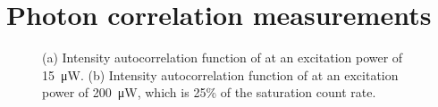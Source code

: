 



\section[g2 Measurements]{Photon correlation measurements} \label{sec::g2}



	\begin{figure}[tp]
		\begin{subfigure}[tp]{ 0.49\linewidth}
			\caption{}\label{subfig::g2_a}
			\centering
		\end{subfigure}
		\hfill
		\begin{subfigure}[tp]{ 0.49\linewidth}
			\caption{}\label{subfig::g2_b}
			\centering
		\end{subfigure}
		\caption{(a) Intensity autocorrelation function of \emnarrow at an excitation power of \SI{15}{\micro\W}. (b) Intensity autocorrelation function of \embroad at an excitation power of \SIlist{200}{\micro\W}, which is 25\% of the saturation count rate.}
		\label{fig::g2}
	\end{figure}


